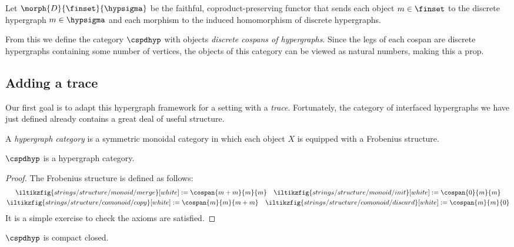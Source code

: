 \begin{definition}
    Let \(\morph{D}{\finset}{\hypsigma}\) be the faithful, coproduct-preserving
    functor that sends each object \(m \in \finset\) to the discrete hypergraph
    \(m \in \hypsigma\) and each morphism to the induced homomorphism of
    discrete hypergraphs.
\end{definition}

\noindent
From this we define the category \(\cspdhyp\) with objects
\emph{discrete cospans of hypergraphs}.
Since the legs of each cospan are discrete hypergraphs containing some number of
vertices, the objects of this category can be viewed as natural numbers, making
this a prop.

\subsection{Adding a trace}

Our first goal is to adapt this hypergraph framework for a setting with a
\emph{trace}.
Fortunately, the category of interfaced hypergraphs we have just defined already
contains a great deal of useful structure.

\begin{definition}
    A \emph{hypergraph category} is a symmetric monoidal category in which each
    object \(X\) is equipped with a Frobenius structure.
\end{definition}

\begin{proposition}
    \(\cspdhyp\) is a hypergraph category.
\end{proposition}
\begin{proof}
    The Frobenius structure is defined as follows:
    \begin{gather*}
        \iltikzfig{strings/structure/monoid/merge}[white]
        :=
        \cospan{m + m}{m}{m}
        \quad
        \iltikzfig{strings/structure/monoid/init}[white]
        :=
        \cospan{0}{m}{m}
        \\
        \iltikzfig{strings/structure/comonoid/copy}[white]
        :=
        \cospan{m}{m}{m+m}
        \quad
        \iltikzfig{strings/structure/comonoid/discard}[white]
        :=
        \cospan{m}{m}{0}
    \end{gather*}
    It is a simple exercise to check the axioms are satisfied.
\end{proof}

\begin{corollary}
    \(\cspdhyp\) is compact closed.
\end{corollary}

